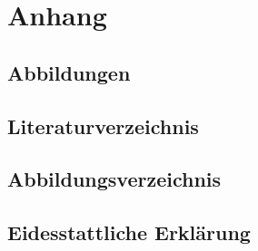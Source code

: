 \documentclass[a4paper,12pt,oneside]{article}
\begin{document}
  \section{Anhang}
    \subsection{Abbildungen}
    \subsection{Literaturverzeichnis}
      \printbibliography
    \subsection{Abbildungsverzeichnis}
    \subsection{Eidesstattliche Erklärung} 
\end{document}
